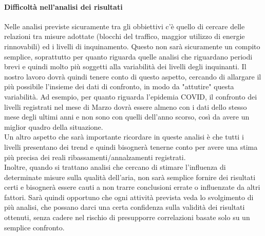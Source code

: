 \documentclass{article}
\begin{document}
\paragraph{Difficoltà nell'analisi dei risultati}
Nelle analisi previste sicuramente tra gli obbiettivi c'è quello di cercare delle relazioni tra misure adottate (blocchi del traffico, maggior utilizzo di energie rinnovabili) ed i livelli di inquinamento. Questo non sarà sicuramente un compito semplice, soprattutto per quanto riguarda quelle analisi che riguardano periodi brevi e quindi molto più soggetti alla variabilità dei livelli degli inquinanti. Il nostro lavoro dovrà quindi tenere conto di questo aspetto, cercando di allargare il più possibile l'insieme dei dati di confronto, in modo da "attutire" questa variabilità. Ad esempio, per quanto riguarda l'epidemia COVID, il confronto dei livelli registrati nel mese di Marzo dovrà essere almeno con i dati dello stesso mese degli ultimi anni e non sono con quelli dell'anno scorso, così da avere un miglior quadro della situazione.
\\Un altro aspetto che sarà importante ricordare in queste analisi è che tutti i livelli presentano dei trend e quindi bisognerà tenerne conto per avere una stima più precisa dei reali ribassamenti/annalzamenti registrati.
\\Inoltre, quando si trattano analisi che cercano di stimare l'influenza di determinate misure sulla qualità dell'aria, non sarà semplice fornire dei risultati certi e bisognerà essere cauti a non trarre conclusioni errate o influenzate da altri fattori. Sarà quindi opportuno che ogni attività prevista veda lo svolgimento di più analisi, che possano darci una certa confidenza sulla validità dei risultati ottenuti, senza cadere nel rischio di presupporre correlazioni basate solo su un semplice confronto.
\newpage



\end{document}
